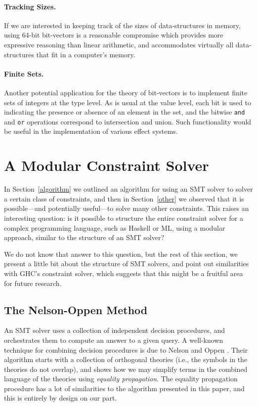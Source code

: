 \documentclass{sigplanconf}
\begin{document}
\paragraph{Tracking Sizes.}
If we are interested in keeping track of the sizes of data-structures
in memory, using 64-bit bit-vectors is a reasonable compromise
which provides more expressive reasoning than linear arithmetic,
and accommodates virtually all data-structures that fit in a computer's memory.

\paragraph{Finite Sets.}
Another potential application for the theory of bit-vectors is
to implement finite sets of integers at the type level.
As is usual at the value level, each bit is used to indicating the presence
or absence of an element in the set, and the bitwise \Verb"and"
and \Verb"or" operations correspond to intersection and union.
Such functionality would be useful in the implementation of various effect
systems.





\section{A Modular Constraint Solver}
\label{modular-typechecker}

In Section~\ref{algorithm} we outlined an algorithm for using an SMT solver
to solver a certain class of constraints, and then
in Section~\ref{other} we observed that it is possible---and potentially
useful---to solve many other constraints.  This raises an interesting
question: is it possible to structure the entire constraint solver for
a complex programming language, such as Haskell or ML, using a modular
approach, similar to the structure of an SMT solver?

We do not know that answer to this question, but the rest of this section,
we present a little bit about the structure of SMT solvers, and point out
similarities with GHC's constraint solver, which suggests that this might
be a fruitful area for future research.

\subsection{The Nelson-Oppen Method}

An SMT solver uses a collection of independent decision procedures,
and orchestrates them to compute an answer to a given query.  A well-known
technique for combining decision procedures is due to Nelson and Oppen
\cite{NelsonOppen}.  Their algorithm starts with a collection of
orthogonal theories (i.e., the symbols in the theories do not overlap),
and shows how we may simplify terms in the combined language of the
theories using {\em equality propagation}.  The equality propagation procedure
has a lot of similarities to the algorithm presented in this paper,
and this is entirely by design on our part.
\end{document}
